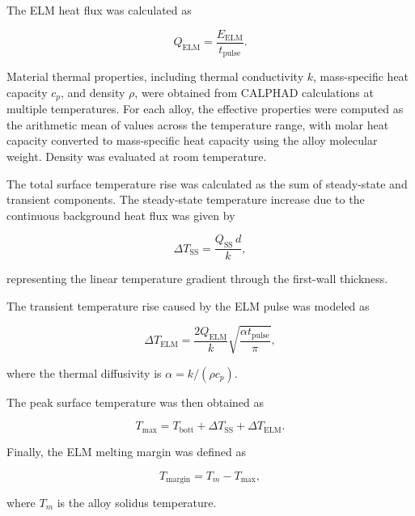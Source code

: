 The ELM heat flux was calculated as

\vspace{0.5em}
\begin{equation}
Q_{\mathrm{ELM}}
=
\frac{E_{\mathrm{ELM}}}{t_{\mathrm{pulse}}}.
\label{eq:elm_heat_flux}
\end{equation}
\vspace{0.5em}

Material thermal properties, including thermal conductivity \(k\), mass-specific
heat capacity \(c_p\), and density \(\rho\), were obtained from CALPHAD
calculations at multiple temperatures. For each alloy, the effective properties
were computed as the arithmetic mean of values across the temperature range, with
molar heat capacity converted to mass-specific heat capacity using the alloy
molecular weight. Density was evaluated at room temperature.

The total surface temperature rise was calculated as the sum of steady-state and
transient components. The steady-state temperature increase due to the continuous
background heat flux was given by

\vspace{0.5em}
\begin{equation}
\Delta T_{\mathrm{SS}}
=
\frac{Q_{\mathrm{SS}}\, d}{k},
\label{eq:ss_temp_rise}
\end{equation}
\vspace{0.5em}

representing the linear temperature gradient through the first-wall thickness.

The transient temperature rise caused by the ELM pulse was modeled as

\vspace{0.5em}
\begin{equation}
\Delta T_{\mathrm{ELM}}
=
\frac{2Q_{\mathrm{ELM}}}{k}
\sqrt{\frac{\alpha t_{\mathrm{pulse}}}{\pi}},
\label{eq:elm_temp_rise}
\end{equation}
\vspace{0.5em}

where the thermal diffusivity is \(\alpha=k/(\rho c_p)\).

The peak surface temperature was then obtained as

\vspace{0.5em}
\begin{equation}
T_{\max}
=
T_{\mathrm{bott}}
+
\Delta T_{\mathrm{SS}}
+
\Delta T_{\mathrm{ELM}}.
\label{eq:peak_temp}
\end{equation}
\vspace{0.5em}

Finally, the ELM melting margin was defined as

\vspace{0.5em}
\begin{equation}
T_{\mathrm{margin}}
=
T_m
-
T_{\max},
\label{eq:melting_margin}
\end{equation}
\vspace{0.5em}

\noindent where \(T_m\) is the alloy solidus temperature.